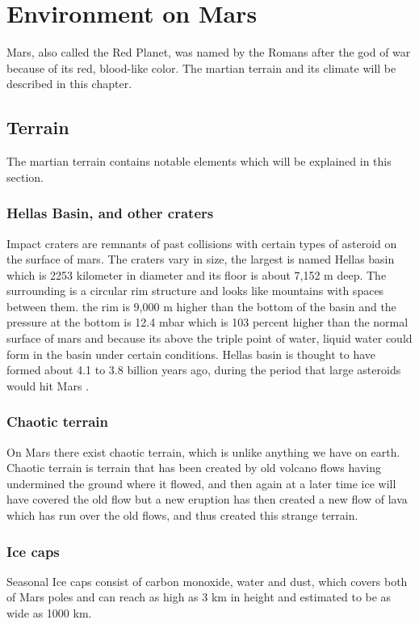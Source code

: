 \chapter{Environment on Mars}\label{ch:environmentOnMars}

Mars, also called the Red Planet, was named by the Romans after the god of war because of its red, blood-like color. The martian terrain and its climate will be described in this chapter.

\section{Terrain} 
The martian terrain contains notable elements which will be explained in this section.

\subsection{Hellas Basin, and other craters}
Impact craters are remnants of past collisions with certain types of asteroid on the surface of mars. The craters vary in size, the largest is named Hellas basin which is 2253 kilometer in diameter and its floor is about 7,152 m  deep. The surrounding is a circular rim structure and looks like mountains with spaces between them.
the rim is 9,000 m higher than the bottom of the basin and the pressure at the bottom is 12.4  mbar which is  103 percent higher than the normal surface of mars  and because its above the triple point of water, liquid water could form in the basin under certain conditions. Hellas basin is thought to have formed about 4.1 to 3.8 billion years ago, during the period that large asteroids would hit Mars \cite{hellas}.

\subsection{Chaotic terrain}\label{ch:chaoticT}
On Mars there exist chaotic terrain, which is unlike anything we have on earth.\\
Chaotic terrain is terrain that has been created by old volcano flows having undermined the ground where it flowed, and then again at a later time ice will have covered the old flow but a new eruption has then created a new flow of lava which has run over the old flows, and thus created this strange terrain\cite{CTerrain}.

\subsection{Ice caps}
Seasonal Ice caps consist of carbon monoxide, water and dust, which covers both of Mars poles and can reach as high as 3 km in height and estimated to be as wide as 1000 km.

